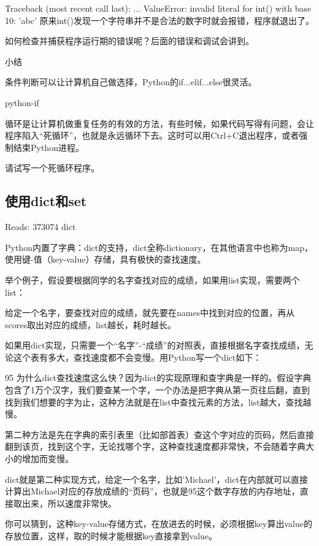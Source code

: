 Traceback (most recent call last):
  ...
ValueError: invalid literal for int() with base 10: 'abc'
原来int()发现一个字符串并不是合法的数字时就会报错，程序就退出了。

如何检查并捕获程序运行期的错误呢？后面的错误和调试会讲到。

小结

条件判断可以让计算机自己做选择，Python的if...elif...else很灵活。

python-if

循环是让计算机做重复任务的有效的方法，有些时候，如果代码写得有问题，会让程序陷入“死循环”，也就是永远循环下去。这时可以用Ctrl+C退出程序，或者强制结束Python进程。


请试写一个死循环程序。






\subsection{使用dict和set}

Reads: 373074
dict

Python内置了字典：dict的支持，dict全称dictionary，在其他语言中也称为map，使用键-值（key-value）存储，具有极快的查找速度。

举个例子，假设要根据同学的名字查找对应的成绩，如果用list实现，需要两个list：

给定一个名字，要查找对应的成绩，就先要在names中找到对应的位置，再从scores取出对应的成绩，list越长，耗时越长。

如果用dict实现，只需要一个“名字”-“成绩”的对照表，直接根据名字查找成绩，无论这个表有多大，查找速度都不会变慢。用Python写一个dict如下：

95
为什么dict查找速度这么快？因为dict的实现原理和查字典是一样的。假设字典包含了1万个汉字，我们要查某一个字，一个办法是把字典从第一页往后翻，直到找到我们想要的字为止，这种方法就是在list中查找元素的方法，list越大，查找越慢。

第二种方法是先在字典的索引表里（比如部首表）查这个字对应的页码，然后直接翻到该页，找到这个字，无论找哪个字，这种查找速度都非常快，不会随着字典大小的增加而变慢。

dict就是第二种实现方式，给定一个名字，比如'Michael'，dict在内部就可以直接计算出Michael对应的存放成绩的“页码”，也就是95这个数字存放的内存地址，直接取出来，所以速度非常快。

你可以猜到，这种key-value存储方式，在放进去的时候，必须根据key算出value的存放位置，这样，取的时候才能根据key直接拿到value。

